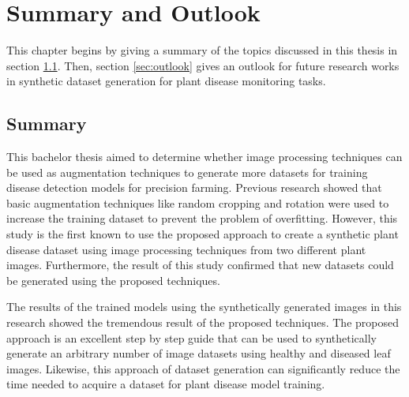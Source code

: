 \chapter{Summary and Outlook}\label{cha:SummaryOutlook}
This chapter begins by giving a summary of the topics discussed in this thesis in section \ref{sec:summary}. Then, section \ref{sec:outlook} gives an outlook for future research works in synthetic dataset generation for plant disease monitoring tasks.


\section{Summary}\label{sec:summary}
This bachelor thesis aimed to determine whether image processing techniques can be used as augmentation techniques to generate more datasets for training disease detection models for precision farming. Previous research showed that basic augmentation techniques like random cropping and rotation were used to increase the training dataset to prevent the problem of overfitting. However, this study is the first known to use the proposed approach to create a synthetic plant disease dataset using image processing techniques from two different plant images. Furthermore, the result of this study confirmed that new datasets could be generated using the proposed techniques.

The results of the trained models using the synthetically generated images in this research showed the tremendous result of the proposed techniques. The proposed approach is an excellent step by step guide that can be used to synthetically generate an arbitrary number of image datasets using healthy and diseased leaf images. Likewise, this approach of dataset generation can significantly reduce the time needed to acquire a dataset for plant disease model training.




